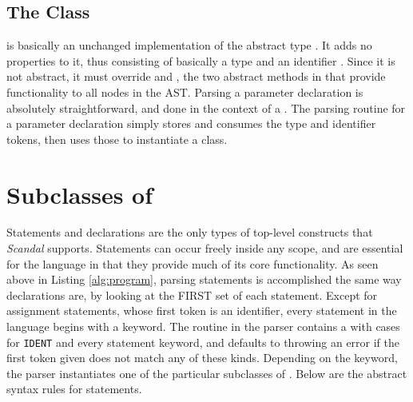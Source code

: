 \subsection{The  Class}

 is basically an unchanged implementation of the abstract type . It adds no properties to it, thus consisting of basically a type  and an identifier . Since it is not abstract, it must override  and , the two abstract methods in  that provide functionality to all nodes in the AST. Parsing a parameter declaration is absolutely straightforward, and done in the context of a . The parsing routine for a parameter declaration simply stores and consumes the type and identifier tokens, then uses those to instantiate a  class.

\section{Subclasses of }

Statements and declarations are the only types of top-level constructs that \emph{Scandal} supports. Statements can occur freely inside any scope, and are essential for the language in that they provide much of its core functionality. As seen above in Listing \ref{alg:program}, parsing statements is accomplished the same way declarations are, by looking at the FIRST set of each statement. Except for assignment statements, whose first token is an identifier, every statement in the language begins with a keyword. The  routine in the parser contains a  with cases for \texttt{IDENT} and every statement keyword, and defaults to throwing an error if the first token given does not match any of these kinds. Depending on the keyword, the parser instantiates one of the particular subclasses of . Below are the abstract syntax rules for statements.

